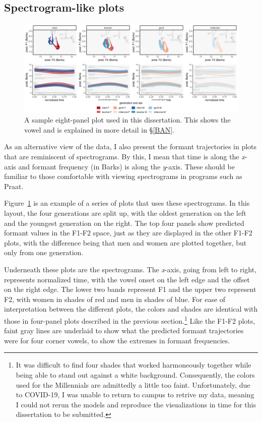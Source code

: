 \subsection{Spectrogram-like plots}

\begin{figure}[tb!]
	\centering
  \includegraphics[width = 6.5in]{Figures/BAT/BAT_sex_panel_plot_wide.pdf}
	\caption[A sample eight-panel plot used in this dissertation.]{A sample eight-panel plot used in this dissertation. This shows the \ban vowel and is explained in more detail in \S\ref{BAN}.}
	\label{fig:sample_spectrogram_plot}
\end{figure}

As an alternative view of the data, I also present the formant trajectories in plots that are reminiscent of spectrograms. By this, I mean that time is along the \textit{x}-axis and formant frequency (in Barks) is along the \textit{y}-axis. These should be familiar to those comfortable with viewing spectrograms in programs such as Praat.

Figure~\ref{fig:sample_spectrogram_plot} is an example of a series of plots that uses these spectrograms. In this layout, the four generations are split up, with the oldest generation on the left and the youngest generation on the right. The top four panels show predicted formant values in the F1-F2 space, just as they are displayed in the other F1-F2 plots, with the difference being that men and women are plotted together, but only from one generation.

Underneath these plots are the spectrograms. The \textit{x}-axis, going from left to right, represents normalized time, with the vowel onset on the left edge and the offset on the right edge. The lower two bands represent F1 and the upper two represent F2, with women in shades of red and men in shades of blue. For ease of interpretation between the different plots, the colors and shades are identical with those in four-panel plots described in the previous section.\footnote{It was difficult to find four shades that worked harmoneously together while being able to stand out against a white background. Consequently, the colors used for the Millennials are admittedly a little too faint. Unfortunately, due to COVID-19, I was unable to return to campus to retrive my data, meaning I could not rerun the models and reproduce the visualizations in time for this dissertation to be submitted.} Like the F1-F2 plots, faint gray lines are underlaid to show what the predicted formant trajectories were for four corner vowels, to show the extremes in formant frequencies.

